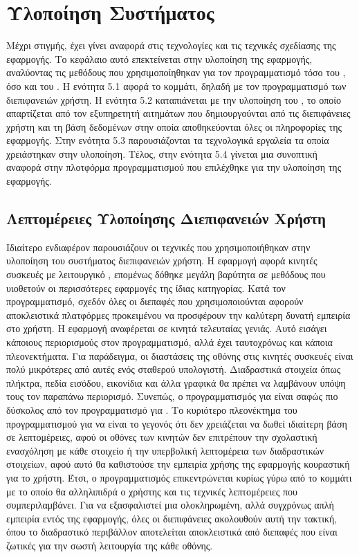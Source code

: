 \chapter{Υλοποίηση Συστήματος}
\label{chap5}

Μέχρι στιγμής, έχει γίνει αναφορά στις τεχνολογίες και τις τεχνικές σχεδίασης της εφαρμογής. Το κεφάλαιο αυτό επεκτείνεται στην υλοποίηση της εφαρμογής, αναλύοντας τις μεθόδους που χρησιμοποίηθηκαν για τον προγραμματισμό τόσο του , όσο και του . Η ενότητα 5.1 αφορά το  κομμάτι, δηλαδή με τον προγραμματισμό των διεπιφανειών χρήστη. Η ενότητα 5.2 καταπιάνεται με την υλοποίηση του , το οποίο απαρτίζεται από τον εξυπηρετητή αιτημάτων που δημιουργούνται από τις διεπιφάνειες χρήστη και τη βάση δεδομένων στην οποία αποθηκεύονται όλες οι πληροφορίες της εφαρμογής. Στην ενότητα 5.3 παρουσιάζονται τα τεχνολογικά εργαλεία τα οποία χρειάστηκαν στην υλοποίηση. Τέλος, στην ενότητα 5.4 γίνεται μια συνοπτική αναφορά στην πλοτφόρμα προγραμματισμού που επιλέχθηκε για την υλοποίηση της εφαρμογής. 


\section{Λεπτομέρειες Υλοποίησης Διεπιφανειών Χρήστη}
Ιδιαίτερο ενδιαφέρον παρουσιάζουν οι τεχνικές που χρησιμοποιήθηκαν στην υλοποίηση του συστήματος διεπιφανειών χρήστη. Η εφαρμογή αφορά κινητές συσκευές με λειτουργικό , επομένως δόθηκε μεγάλη βαρύτητα σε μεθόδους που υιοθετούν οι περισσότερες  εφαρμογές της ίδιας κατηγορίας. Κατά τον προγραμματισμό, σχεδόν όλες οι διεπαφές που χρησιμοποιούνται αφορούν αποκλειστικά  πλατφόρμες προκειμένου να προσφέρουν την καλύτερη δυνατή εμπειρία στο χρήστη.
\newline
\indent
Η εφαρμογή αναφέρεται σε κινητά τελευταίας γενιάς. Αυτό εισάγει κάποιους περιορισμούς στον προγραμματισμό, αλλά έχει ταυτοχρόνως και κάποια πλεονεκτήματα. Για παράδειγμα, οι διαστάσεις της οθόνης στις κινητές συσκευές είναι πολύ μικρότερες από αυτές ενός σταθερού υπολογιστή. Διαδραστικά στοιχεία όπως πλήκτρα, πεδία εισόδου, εικονίδια και άλλα γραφικά θα πρέπει να λαμβάνουν υπόψη τους τον παραπάνω περιορισμό. Συνεπώς, ο προγραμματισμός για  είναι σαφώς πιο δύσκολος από τον προγραμματισμό για . 
\newline
\indent
Το κυριότερο πλεονέκτημα του προγραμματισμού για να  είναι το γεγονός ότι δεν χρειάζεται να δωθεί ιδιαίτερη βάση σε λεπτομέρειες, αφού οι οθόνες των κινητών δεν επιτρέπουν την σχολαστική ενασχόληση με κάθε στοιχείο ή την υπερβολική λεπτομέρεια των διαδραστικών στοιχείων, αφού αυτό θα καθιστούσε την εμπειρία χρήσης της εφαρμογής κουραστική για το χρήστη. Έτσι, ο προγραμματισμός επικεντρώνεται κυρίως γύρω από το κομμάτι με το οποίο θα αλληλιπιδρά ο χρήστης και τις τεχνικές λεπτομέρειες που συμπεριλαμβάνει. Για να εξασφαλιστεί μια ολοκληρωμένη, αλλά συγχρόνως απλή εμπειρία εντός της εφαρμογής, όλες οι διεπιφάνειες ακολουθούν αυτή την τακτική, όπου το διαδραστικό περιβάλλον αποτελείται αποκλειστικά από διεπαφές που είναι ζωτικές για την σωστή λειτουργία της κάθε οθόνης.


